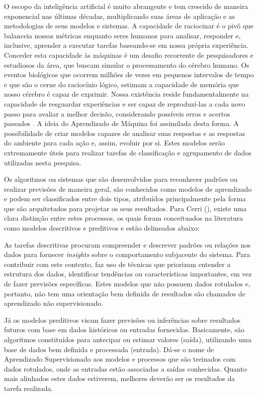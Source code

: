 \documentclass[tcc2]{uftex}
\begin{document}
O escopo da inteligência artificial é muito abrangente e tem crescido de maneira exponencial nas últimas décadas, multiplicando suas áreas de aplicação e as metodologias de seus modelos e sistemas. A capacidade de raciocinar é o pivô que balanceia nossas métricas enquanto seres humanos para analisar, responder e, inclusive, aprender a executar tarefas baseando-se em nossa própria experiência. Conceder esta capacidade às máquinas é um desafio recorrente de pesquisadores e estudiosos da área, que buscam simular o processamento do cérebro humano. Os eventos biológicos que ocorrem milhões de vezes em pequenos intervalos de tempo e que são o cerne do raciocínio lógico, estimam a capacidade de memória que nosso cérebro é capaz de exprimir. Nossa existência reside fundamentalmente na capacidade de resguardar experiências e ser capaz de reproduzí-las a cada novo passo para avaliar a melhor decisão, considerando possíveis erros e acertos passados \cite{cerri17}. A ideia do Aprendizado de Máquina foi assimilada desta forma. A possibilidade de criar modelos capazes de analisar suas respostas e as respostas do ambiente para cada ação e, assim, evoluir por si. Estes modelos serão extremamente úteis para realizar tarefas de classificação e agrupamento de dados utilizadas nesta pesquisa.

Os algoritmos ou sistemas que são desenvolvidos para reconhecer padrões ou realizar previsões de maneira geral, são conhecidos como modelos de aprendizado e podem ser classificados entre dois tipos, atribuídos principalmente pela forma que são arquitetados para projetar os seus resultados. Para Cerri (\citeyear{cerri17}), existe uma clara distinção entre estes processos, os quais foram conceituados na literatura como modelos descritivos e preditivos e estão delineados abaixo:

As tarefas descritivas procuram compreender e descrever padrões ou relações nos dados para fornecer \textit{insights} sobre o comportamento subjacente do sistema. Para contribuir com este contexto, faz uso de técnicas que priorizam entender a estrutura dos dados, identificar tendências ou características importantes, em vez de fazer previsões específicas. Estes modelos que não possuem dados rotulados e, portanto, não tem uma orientação bem definida de resultados são chamados de aprendizado não supervisionado.

Já os modelos preditivos visam fazer previsões ou inferências sobre resultados futuros com base em dados históricos ou entradas fornecidas. Basicamente, são algoritmos constituídos para antecipar ou estimar valores (saída), utilizando uma base de dados bem definida e processada (entrada). Dá-se o nome de Aprendizado Supervisionado aos modelos e processos que são treinados com dados rotulados, onde as entradas estão associadas a saídas conhecidas. Quanto mais alinhados estes dados estiverem, melhores deverão ser os resultados da tarefa realizada.
\end{document}
